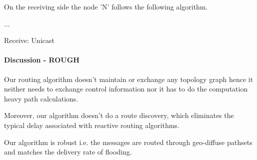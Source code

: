 On the receiving side the node 'N' follows the following algorithm.

\begin{algorithm}
\SetAlgoLined
{...\;}
\caption{Receive: Unicast} \label{unicast_recv}
\end{algorithm}

\paragraph{Discussion - ROUGH}

Our routing algorithm doesn't maintain or exchange any topology graph hence it neither needs to exchange control information nor it has to do the computation heavy path calculations.

Moreover, our algorithm doesn't do a route discovery, which eliminates the typical delay associated with reactive routing algorithms. 

Our algorithm is robust i.e. the messages are routed through geo-diffuse pathsets and matches the delivery rate of flooding.